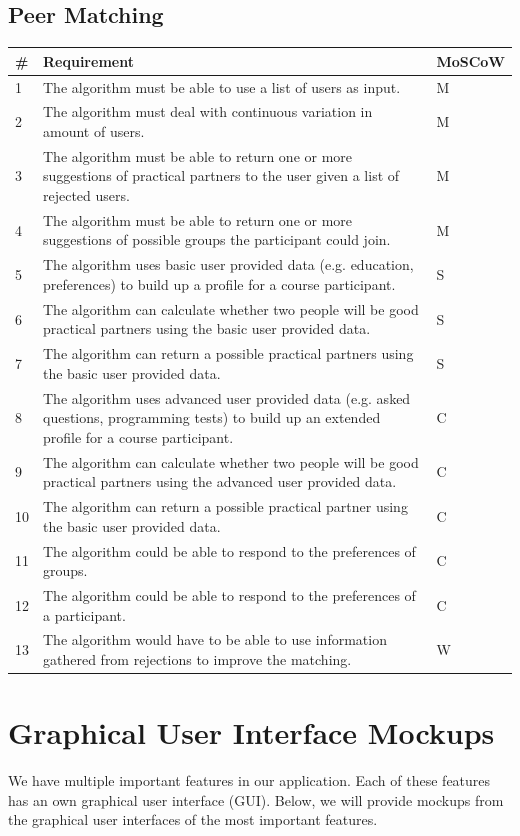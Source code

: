\subsection{Peer Matching}
\begin{tabular}{ | p{0.5cm} | p{12cm} | p{2cm} | }
 \hline
 \textbf{\#} & \textbf{Requirement} & \textbf{MoSCoW} \\ \hline
1 & The algorithm must be able to use a list of users as input. & M \\ \hline
2 & The algorithm must deal with continuous variation in amount of users. & M \\ \hline
3 & The algorithm must be able to return one or more suggestions of practical partners to the user given a list of rejected users. & M \\ \hline
4 & The algorithm must be able to return one or more suggestions of possible groups the participant could join. & M \\ \hline
5 & The algorithm uses basic user provided data (e.g. education, preferences) to build up a profile for a course participant. & S \\ \hline
6 & The algorithm can calculate whether two people will be good practical partners using the basic user provided data. & S \\ \hline
7 & The algorithm can return a possible practical partners using the basic user provided data. & S \\ \hline
8 & The algorithm uses advanced user provided data (e.g. asked questions, programming tests) to build up an extended profile for a course participant. & C \\ \hline
9 & The algorithm can calculate whether two people will be good practical partners using the advanced user provided data. & C \\ \hline
10 & The algorithm can return a possible practical partner using the basic user provided data. & C \\ \hline
11 & The algorithm could be able to respond to the preferences of groups. & C \\ \hline
12 & The algorithm could be able to respond to the preferences of a participant. & C \\ \hline
13 & The algorithm would have to be able to use information gathered from rejections to improve the matching. & W \\
\hline
\end{tabular}

\section{Graphical User Interface Mockups}
We have multiple important features in our application.
Each of these features has an own graphical user interface (GUI).
Below, we will provide mockups from the graphical user interfaces of the most important features.

